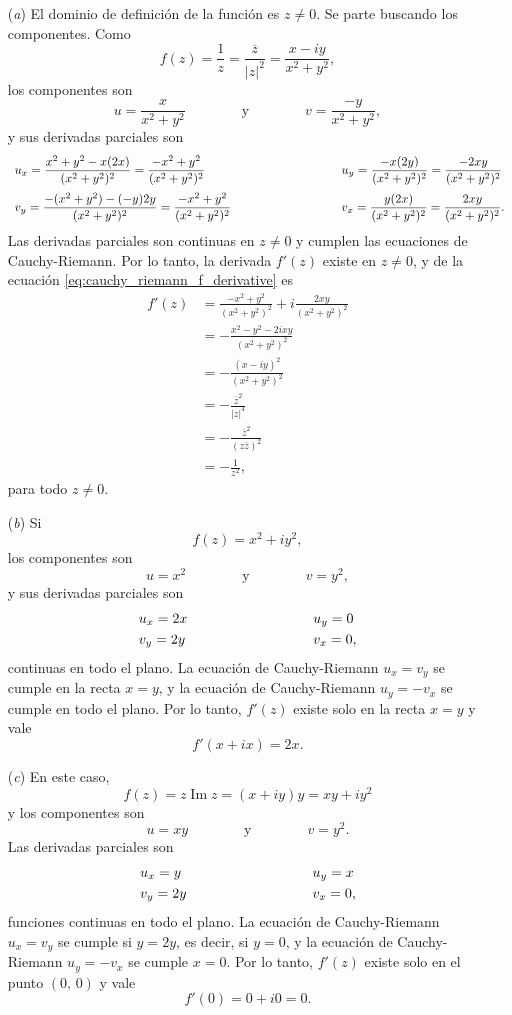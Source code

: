\documentclass[a4paper]{report}
\renewcommand{\Im}{\operatorname{Im}}
\begin{document}
\begin{enumerate}
 \item[(\textit{a})] El dominio de definición de la función es \(z\neq0\). Se parte buscando los componentes. Como
 \[
  f(z)=\frac{1}{z}=\frac{\overline{z}}{|z|^2}=\frac{x-iy}{x^2+y^2},
 \]
 los componentes son 
 \[
  u=\frac{x}{x^2+y^2}
  \qquad\qquad\textrm{y}\qquad\qquad
  v=\frac{-y}{x^2+y^2},
 \]
 y sus derivadas parciales son 
 \[
 \begin{array}{ll}
  u_x=\dfrac{x^2+y^2-x(2x)}{(x^2+y^2)^2}=\dfrac{-x^2+y^2}{(x^2+y^2)^2}
  \qquad\qquad\qquad\qquad&
  u_y=\dfrac{-x(2y)}{(x^2+y^2)^2}=\dfrac{-2xy}{(x^2+y^2)^2}\\[\bigskipamount]
  v_y=\dfrac{-(x^2+y^2)-(-y)2y}{(x^2+y^2)^2}=\dfrac{-x^2+y^2}{(x^2+y^2)^2}
  \qquad\qquad\qquad\qquad&
  v_x=\dfrac{y(2x)}{(x^2+y^2)^2}=\dfrac{2xy}{(x^2+y^2)^2}.
 \end{array}
 \]
 Las derivadas parciales son continuas en \(z\neq0\) y cumplen las ecuaciones de Cauchy-Riemann. Por lo tanto, la derivada \(f'(z)\) existe en \(z\neq0\), y de la ecuación \ref{eq:cauchy_riemann_f_derivative} es
 \begin{align*}
  f'(z)&=\frac{-x^2+y^2}{(x^2+y^2)^2}+i\frac{2xy}{(x^2+y^2)^2}\\
   &=-\frac{x^2-y^2-2ixy}{(x^2+y^2)^2}\\
   &=-\frac{(x-iy)^2}{(x^2+y^2)^2}\\
   &=-\frac{\overline{z}^2}{|z|^4}\\
   &=-\frac{\overline{z}^2}{(z\overline{z})^2}\\
   &=-\frac{1}{z^2},
 \end{align*}
 para todo \(z\neq0\).
 \item[(\textit{b})] Si
 \[
  f(z)=x^2+iy^2,
 \]
 los componentes son 
 \[
  u=x^2
  \qquad\qquad\textrm{y}\qquad\qquad
  v=y^2,
 \]
 y sus derivadas parciales son 
 \[
 \begin{array}{ll}
  u_x=2x\qquad\qquad\qquad\qquad&u_y=0\\[\smallskipamount]
  v_y=2y\qquad\qquad\qquad\qquad&v_x=0,
 \end{array}
 \]
 continuas en todo el plano. La ecuación de Cauchy-Riemann \(u_x=v_y\) se cumple en la recta \(x=y\), y la ecuación de Cauchy-Riemann \(u_y=-v_x\) se cumple en todo el plano. Por lo tanto, \(f'(z)\) existe solo en la recta \(x=y\) y vale
 \[
  f'(x+ix)=2x.
 \]
 \item[(\textit{c})] En este caso,
 \[
  f(z)=z\Im z=(x+iy)y=xy+iy^2
 \]
 y los componentes son
 \[
  u=xy
  \qquad\qquad\textrm{y}\qquad\qquad
  v=y^2.
 \]
 Las derivadas parciales son 
 \[
 \begin{array}{ll}
  u_x=y\qquad\qquad\qquad\qquad&u_y=x\\[\smallskipamount]
  v_y=2y\qquad\qquad\qquad\qquad&v_x=0,
 \end{array}
 \]
 funciones continuas en todo el plano. La ecuación de Cauchy-Riemann \(u_x=v_y\) se cumple si \(y=2y\), es decir, si \(y=0\), y la ecuación de Cauchy-Riemann \(u_y=-v_x\) se cumple \(x=0\). Por lo tanto, \(f'(z)\) existe solo en el punto \((0,\,0)\) y vale
 \[
  f'(0)=0+i0=0.
 \] 
\end{enumerate}
\end{document}
